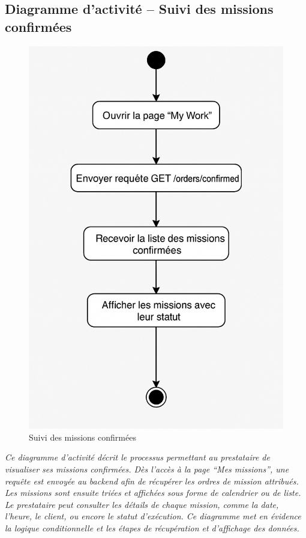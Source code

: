 \subsection*{Diagramme d’activité – Suivi des missions confirmées}
\begin{figure}[H]
\centering
\includegraphics[width=0.85\linewidth]{figures/work act.png}
\caption{Suivi des missions confirmées}
\end{figure}

\textit{Ce diagramme d’activité décrit le processus permettant au prestataire de visualiser ses missions confirmées. Dès l’accès à la page “Mes missions”, une requête est envoyée au backend afin de récupérer les ordres de mission attribués. Les missions sont ensuite triées et affichées sous forme de calendrier ou de liste. Le prestataire peut consulter les détails de chaque mission, comme la date, l’heure, le client, ou encore le statut d’exécution. Ce diagramme met en évidence la logique conditionnelle et les étapes de récupération et d’affichage des données.}


